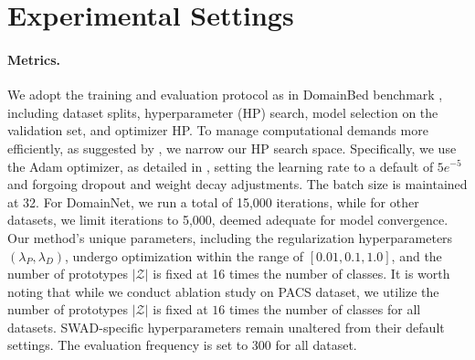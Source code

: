 \section{Experimental Settings}
\label{apd:settings}


\paragraph{Metrics.} We adopt the training and evaluation protocol as in DomainBed benchmark \citep{gulrajani2020search}, including dataset splits, hyperparameter (HP) search, model selection on the validation set, and optimizer HP. To manage computational demands more efficiently, as suggested by \citep{cha2021swad}, we narrow our HP search space. Specifically, we use the Adam optimizer, as detailed in \citep{gulrajani2020search}, setting the learning rate to a default of $5e^{-5}$ and forgoing dropout and weight decay adjustments. The batch size is maintained at 32. For DomainNet, we run a total of 15,000 iterations, while for other datasets, we limit iterations to 5,000, deemed adequate for model convergence. Our method's unique parameters, including the regularization hyperparameters $(\lambda_P, \lambda_D)$, undergo optimization within the range of $[0.01, 0.1, 1.0]$, and the number of prototypes $\left | \mathcal{Z} \right |$ is fixed at 16 times the number of classes. It is worth noting that  while we conduct ablation study on PACS dataset, we utilize the number of prototypes $\left | \mathcal{Z} \right |$ is fixed at $16$ times the number of classes for all datasets.
SWAD-specific hyperparameters remain unaltered from their default settings. The evaluation frequency is set to 300 for all dataset.

